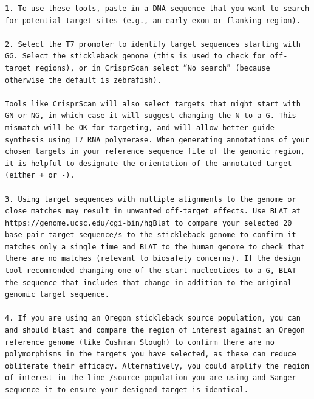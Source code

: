 \documentclass[
  letterpaper,
  DIV=11,
  numbers=noendperiod]{scrreprt}
\begin{document}
\begin{verbatim}
1. To use these tools, paste in a DNA sequence that you want to search for potential target sites (e.g., an early exon or flanking region).   

2. Select the T7 promoter to identify target sequences starting with GG. Select the stickleback genome (this is used to check for off-target regions), or in CrisprScan select “No search” (because otherwise the default is zebrafish). 

Tools like CrisprScan will also select targets that might start with GN or NG, in which case it will suggest changing the N to a G. This mismatch will be OK for targeting, and will allow better guide synthesis using T7 RNA polymerase. When generating annotations of your chosen targets in your reference sequence file of the genomic region, it is helpful to designate the orientation of the annotated target (either + or -). 

3. Using target sequences with multiple alignments to the genome or close matches may result in unwanted off-target effects. Use BLAT at https://genome.ucsc.edu/cgi-bin/hgBlat to compare your selected 20 base pair target sequence/s to the stickleback genome to confirm it matches only a single time and BLAT to the human genome to check that there are no matches (relevant to biosafety concerns). If the design tool recommended changing one of the start nucleotides to a G, BLAT the sequence that includes that change in addition to the original genomic target sequence.  

4. If you are using an Oregon stickleback source population, you can and should blast and compare the region of interest against an Oregon reference genome (like Cushman Slough) to confirm there are no polymorphisms in the targets you have selected, as these can reduce obliterate their efficacy. Alternatively, you could amplify the region of interest in the line /source population you are using and Sanger sequence it to ensure your designed target is identical. 
\end{verbatim}
\end{document}
